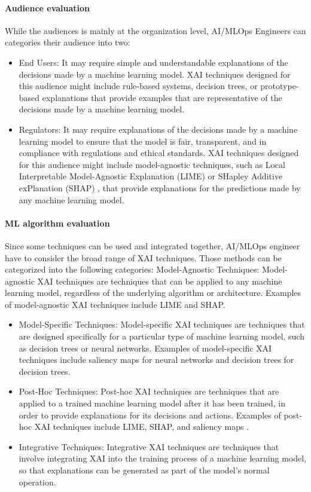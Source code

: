 \documentclass[conference]{IEEEtran}
\begin{document}
\paragraph{Audience evaluation} While the audiences is mainly at the organization level, AI/MLOps Engineers can categories their audience into two:
\begin{itemize}
	\item End Users: It may require simple and understandable explanations of the decisions made by a machine learning model. XAI techniques designed for this audience might include rule-based systems, decision trees, or prototype-based explanations that provide examples that are representative of the decisions made by a machine learning model.
	\item Regulators: It may require explanations of the decisions made by a machine learning model to ensure that the model is fair, transparent, and in compliance with regulations and ethical standards. XAI techniques designed for this audience might include model-agnostic techniques, such as Local Interpretable Model-Agnostic Explanation (LIME) \cite{lime} or SHapley Additive
exPlanation (SHAP) \cite{shap}, that provide explanations for the predictions made by any machine learning model.
\end{itemize}
\paragraph{ML algorithm evaluation} Since some techniques can be used and integrated together, AI/MLOps engineer have to consider the broad range of XAI techniques. Those methods can be categorized into the following categories:
Model-Agnostic Techniques: Model-agnostic XAI techniques are techniques that can be applied to any machine learning model, regardless of the underlying algorithm or architecture. Examples of model-agnostic XAI techniques include LIME and SHAP.
\begin{itemize}
	\item Model-Specific Techniques: Model-specific XAI techniques are techniques that are designed specifically for a particular type of machine learning model, such as decision trees or neural networks. Examples of model-specific XAI techniques include saliency maps for neural networks and decision trees for decision trees.

	\item Post-Hoc Techniques: Post-hoc XAI techniques are techniques that are applied to a trained machine learning model after it has been trained, in order to provide explanations for its decisions and actions. Examples of post-hoc XAI techniques include LIME, SHAP, and saliency maps \cite{kadir2001saliency}.

	\item Integrative Techniques: Integrative XAI techniques are techniques that involve integrating XAI into the training process of a machine learning model, so that explanations can be generated as part of the model's normal operation.
\end{itemize}
\end{document}
